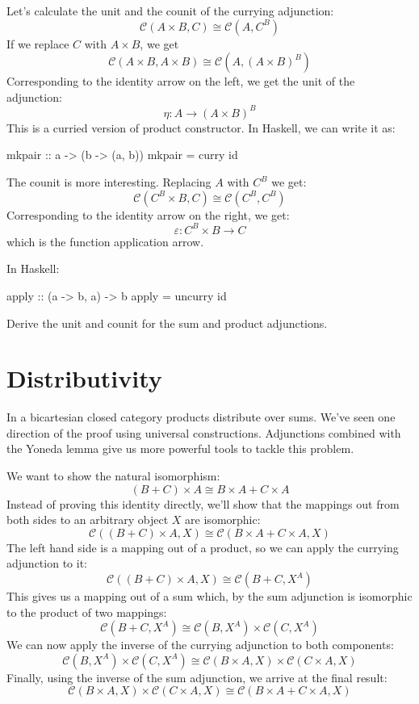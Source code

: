 \documentclass[DaoFP]{subfiles}
\begin{document}
Let's calculate the unit and the counit of the currying adjunction:
\[  \mathcal{C}(A \times B, C ) \cong  \mathcal{C} (A, C^B)  \]
If we replace $C$ with $A \times B$, we get
\[  \mathcal{C}(A \times B, A \times B ) \cong  \mathcal{C} (A, (A \times B)^B)  \]
Corresponding to the identity arrow on the left, we get the unit of the adjunction:
\[ \eta \colon A \to (A \times B)^B \]
This is a curried version of product constructor. In Haskell, we can write it as:
\begin{haskell}
mkpair :: a -> (b -> (a, b))
mkpair = curry id
\end{haskell}

The counit is more interesting. Replacing $A$ with $C^B$ we get:
\[  \mathcal{C}(C^B \times B, C ) \cong  \mathcal{C} (C^B, C^B)  \]
Corresponding to the identity arrow on the right, we get:
\[ \varepsilon \colon C^B \times B \to C \]
which is the function application arrow. 

In Haskell:
\begin{haskell}
apply :: (a -> b, a) -> b
apply = uncurry id
\end{haskell}

\begin{exercise}
Derive the unit and counit for the sum and product adjunctions.
\end{exercise}

\section{Distributivity}

In a bicartesian closed category products distribute over sums. We've seen one direction of the proof using universal constructions. Adjunctions combined with the Yoneda lemma give us more powerful tools to tackle this problem.

We want to show the natural isomorphism:
\[(B + C) \times A \cong B \times A + C \times A \]
Instead of proving this identity directly, we'll show that the mappings out from both sides to an arbitrary object $X$ are isomorphic:
\[  \mathcal{C} ((B + C) \times A, X) \cong \mathcal{C}(B \times A + C \times A, X) \]
The left hand side is a mapping out of a product, so we can apply the currying adjunction to it:
\[  \mathcal{C} ((B + C) \times A, X) \cong \mathcal{C}(B + C, X^A) \]
This gives us a mapping out of a sum which, by the sum adjunction is isomorphic to the product of two mappings:
\[  \mathcal{C}(B + C, X^A) \cong \mathcal{C}(B, X^A) \times \mathcal{C}(C, X^A)\]
We can now apply the inverse of the currying adjunction to both components:
\[  \mathcal{C}(B, X^A) \times \mathcal{C}(C, X^A) \cong \mathcal{C}(B \times A, X) \times \mathcal{C}(C \times A, X)\]
Finally, using the inverse of the sum adjunction, we arrive at the final result:
\[ \mathcal{C}(B \times A, X) \times \mathcal{C}(C \times A, X) \cong \mathcal{C}(B \times A + C \times A, X) \]
\end{document}
